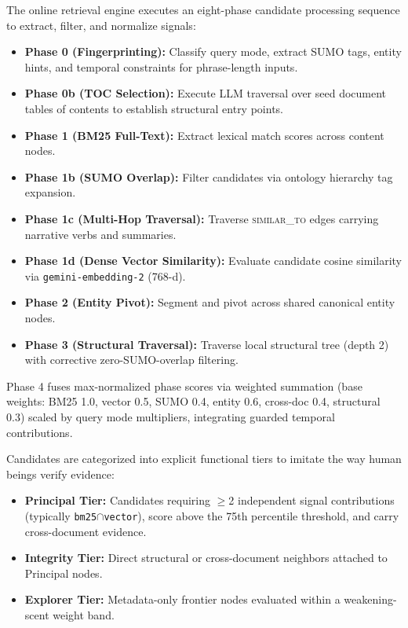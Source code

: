 \documentclass[conference,a4paper]{IEEEtran}
\begin{document}
The online retrieval engine executes an eight-phase candidate processing sequence to extract, filter, and normalize signals:
\begin{itemize}
\item \textbf{Phase 0 (Fingerprinting):} Classify query mode, extract SUMO tags, entity hints, and temporal constraints for phrase-length inputs.
\item \textbf{Phase 0b (TOC Selection):} Execute LLM traversal over seed document tables of contents to establish structural entry points.
\item \textbf{Phase 1 (BM25 Full-Text):} Extract lexical match scores across content nodes.
\item \textbf{Phase 1b (SUMO Overlap):} Filter candidates via ontology hierarchy tag expansion.
\item \textbf{Phase 1c (Multi-Hop Traversal):} Traverse \textsc{similar\_to} edges carrying narrative verbs and summaries.
\item \textbf{Phase 1d (Dense Vector Similarity):} Evaluate candidate cosine similarity via \texttt{gemini-embedding-2} (768-d).
\item \textbf{Phase 2 (Entity Pivot):} Segment and pivot across shared canonical entity nodes.
\item \textbf{Phase 3 (Structural Traversal):} Traverse local structural tree (depth 2) with corrective zero-SUMO-overlap filtering.
\end{itemize}

Phase 4 fuses max-normalized phase scores via weighted summation (base weights: BM25 1.0, vector 0.5, SUMO 0.4, entity 0.6, cross-doc 0.4, structural 0.3) scaled by query mode multipliers, integrating guarded temporal contributions.

Candidates are categorized into explicit functional tiers to imitate the way human beings verify evidence:
\begin{itemize}
\item \textbf{Principal Tier:} Candidates requiring $\geq$2 independent signal contributions (typically \texttt{bm25}$\cap$\texttt{vector}), score above the 75th percentile threshold, and carry cross-document evidence.
\item \textbf{Integrity Tier:} Direct structural or cross-document neighbors attached to Principal nodes.
\item \textbf{Explorer Tier:} Metadata-only frontier nodes evaluated within a weakening-scent weight band.
\end{itemize}
\end{document}
